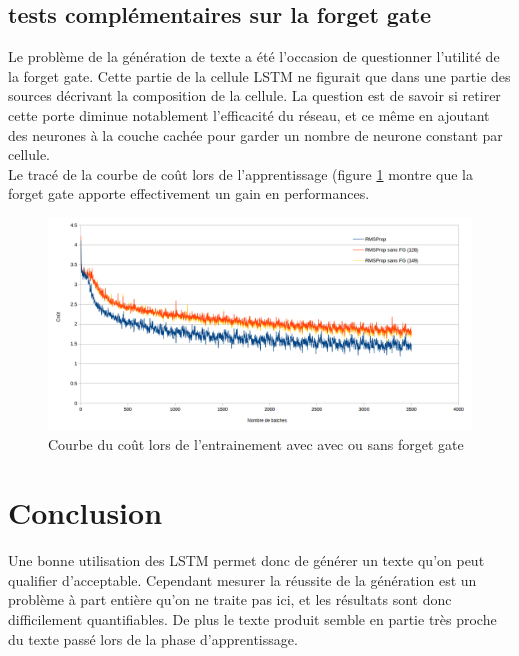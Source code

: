 \subsection{tests complémentaires sur la forget gate}
Le problème de la génération de texte a été l'occasion de questionner l'utilité de la forget gate. Cette partie de la cellule LSTM ne figurait que dans une partie des sources décrivant la composition de la cellule.
La question est de savoir si retirer cette porte diminue notablement l'efficacité du réseau, et ce même en ajoutant des neurones à la couche cachée pour garder un nombre de neurone constant par cellule.
\\ Le tracé de la courbe de coût lors de l'apprentissage (figure \ref{forget_gate} montre que la forget gate apporte effectivement un gain en performances.

\begin{figure}
\begin{center}
\includegraphics[scale=0.5]{images/chapter7/forget_gate.png}
\caption{Courbe du coût lors de l'entrainement avec avec ou sans forget gate}
\label{forget_gate}
\end{center}
\end{figure}


\section{Conclusion}
Une bonne utilisation des LSTM permet donc de générer un texte qu'on peut qualifier d'acceptable. Cependant mesurer la réussite de la génération est un problème à part entière qu'on ne traite pas ici, et les résultats sont donc difficilement quantifiables. De plus le texte produit semble en partie très proche du texte passé lors de la phase d'apprentissage.


